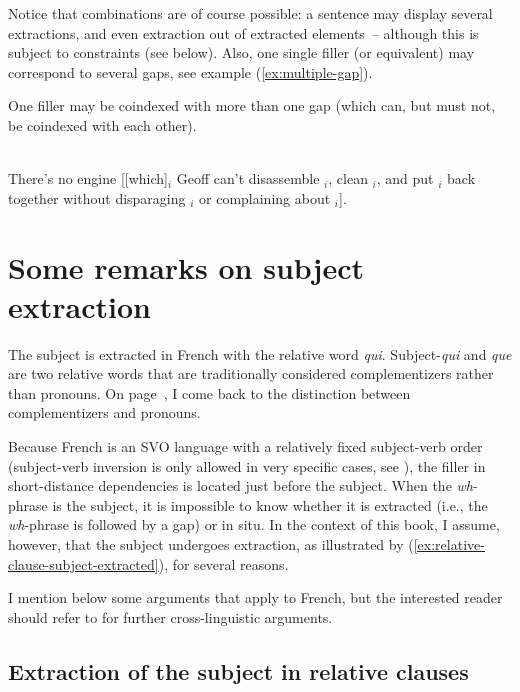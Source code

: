 Notice that combinations are of course possible: a sentence may display several extractions, and even extraction out of extracted elements~-- although this is subject to constraints (see below). Also, one single filler (or equivalent) may correspond to several gaps, see example (\ref{ex:multiple-gap}).  

One filler may be coindexed with more than one gap (which can, but must not, be coindexed with each other). 

\ea \citep[7]{Chaves.2020.UDC}\\
There's no engine [[which]$_i$ Geoff can't disassemble \trace{}$_i$, clean \trace{}$_i$, and put \trace{}$_i$ back together without disparaging \trace{}$_i$ or complaining about \trace{}$_i$]. 
\label{ex:multiple-gap}
\z 

\section{Some remarks on subject extraction}

The subject is extracted in French with the relative word \emph{qui}. Subject-\emph{qui} and \emph{que} are two relative words that are traditionally considered complementizers rather than pronouns. On page~\pageref{p:qui-que-are-complementizers}, I come back to the distinction between complementizers and pronouns.

Because French is an SVO language with a relatively fixed subject-verb order (subject-verb inversion is only allowed in very specific cases, see \citealt{Bonami.2001}), the filler in short-distance dependencies is located just before the subject. When the \textit{wh}-phrase is the subject, it is impossible to know whether it is extracted (i.e., the \textit{wh}-phrase is followed by a gap) or in situ. In the context of this book, I assume, however, that the subject undergoes extraction, as illustrated by (\ref{ex:relative-clause-subject-extracted}), for several reasons.

\label{ex:relative-clause-subject-extracted}
\z 

I mention below some arguments that apply to French, but the interested reader should refer to \citet[28--32]{Chaves.2020.UDC} for further cross-linguistic arguments.

\subsection{Extraction of the subject in relative clauses}

